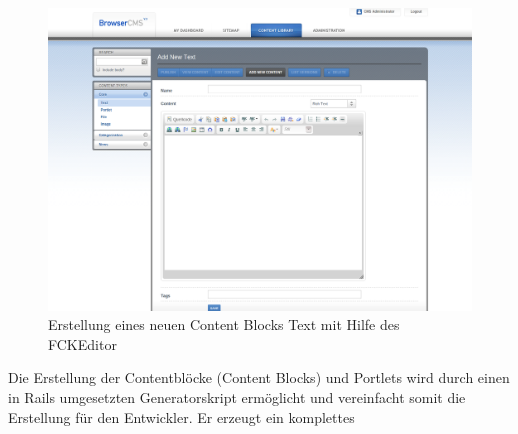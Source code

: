 \begin{figure}[!h]
\begin{center}
\includegraphics[scale=0.3]{images/analyse/browser/editor.png}
\caption{Erstellung eines neuen Content Blocks Text mit Hilfe des FCKEditor}
\label{browsereditor}
\end{center}
\end{figure}

Die Erstellung der Contentblöcke (Content Blocks) und Portlets wird durch einen in Rails umgesetzten Generatorskript ermöglicht und vereinfacht somit die Erstellung für den Entwickler. Er erzeugt ein komplettes



\newpage
